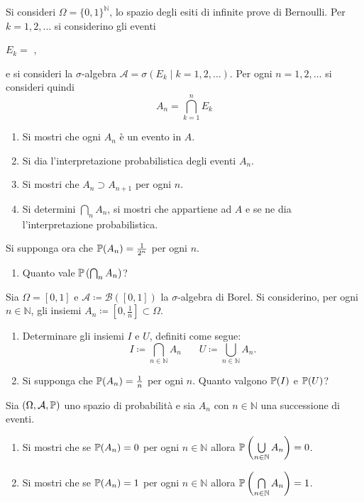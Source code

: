 \Esercizio{}

Si consideri $\Omega =\{0,1\}^{\mathbb{N}}$, lo spazio degli esiti di infinite prove di Bernoulli. Per $k=1,2,\dots $ si considerino gli eventi
\begin{center}
	$E_{k} =$ ,
\end{center}
e si consideri la $\sigma $-algebra $\mathcal{A} =\sigma ( E_{k} \mid k=1,2,\dots )$. Per ogni $n=1,2,\dots $ si consideri quindi
\begin{equation*}
	A_{n} =\bigcap _{k=1}^{n} E_{k}
\end{equation*}
\begin{enumerate}
	\item Si mostri che ogni $A_{n}$ è un evento in $A$.
	\item Si dia l'interpretazione probabilistica degli eventi $A_{n}$.
	\item Si mostri che $A_{n} \supset A_{n+1}$ per ogni $n$.
	\item Si determini $\bigcap _{n} A_{n}$, si mostri che appartiene ad $A$ e se ne dia l'interpretazione probabilistica.
\end{enumerate}
Si supponga ora che $\mathbb{P}( A_{n}) =\frac{1}{2^{n}}$ per ogni $n$.
\begin{enumerate}[resume]
	\item Quanto vale $\mathbb{P}\left(\bigcap_{n} A_{n}\right)$?
\end{enumerate}

\Esercizio{}

Sia $\Omega =[ 0,1]$ e $\mathcal{A} \coloneqq \mathcal{B}([ 0,1])$ la $\sigma $-algebra di Borel. Si considerino, per ogni $n\in \mathbb{N}$, gli insiemi $A_{n} \coloneqq \left[ 0,\frac{1}{n}\right] \subset \Omega $.
\begin{enumerate}
	\item Determinare gli insiemi $I$ e $U$, definiti come segue:
	\begin{equation*}
		I\coloneqq \bigcap _{n\in \mathbb{N}} A_{n} \ \ \ \ \ \ \ \ U\coloneqq \bigcup _{n\in \mathbb{N}} A_{n} .
	\end{equation*}
	\item Si supponga che $\mathbb{P}( A_{n}) =\frac{1}{n}$ per ogni $n$. Quanto valgono $\mathbb{P}( I)$ e $\mathbb{P}( U)$?
\end{enumerate}

\Esercizio{$\star$}

Sia $( \Omega ,\mathcal{A} ,\mathbb{P})$ uno spazio di probabilità e sia $A_{n}$ con $n\in \mathbb{N}$ una successione di eventi.
\begin{enumerate}
	\item Si mostri che se $\mathbb{P}( A_{n}) =0$ per ogni $n\in \mathbb{N}$ allora $\mathbb{P}\left(\bigcup\limits _{n\in \mathbb{N}} A_{n}\right) =0$.
	\item Si mostri che se $\mathbb{P}( A_{n}) =1$ per ogni $n\in \mathbb{N}$ allora $\mathbb{P}\left(\bigcap\limits _{n\in \mathbb{N}} A_{n}\right) =1$.
\end{enumerate}

